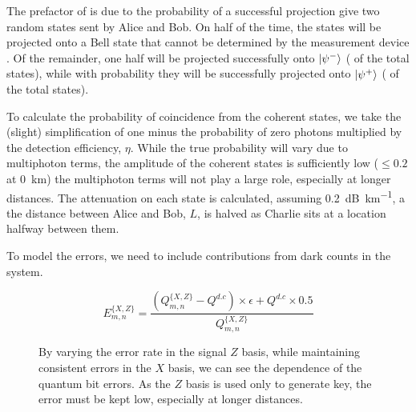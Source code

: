 The prefactor of  is due to the probability of a successful projection give two random states sent by Alice and Bob. On half of the time, the states will be projected onto a Bell state that cannot be determined by the measurement device \cite{}. Of the remainder, one half will be projected successfully onto $\ket{\psi^-}$ ( of the total states), while with probability  they will be successfully projected onto $\ket{\psi^+}$ ( of the total states). 

To calculate the probability of coincidence from the coherent states, we take the (slight) simplification of one minus the probability of zero photons multiplied by the detection efficiency, $\eta$. While the true probability will vary due to multiphoton terms, the amplitude of the coherent states is sufficiently low ($\le 0.2$ at \SI{0}{\km}) the multiphoton terms will not play a large role, especially at longer distances. The attenuation on each state is calculated, assuming \SI{0.2}{dB\per\km}, a the distance between Alice and Bob, $L$, is halved as Charlie sits at a location halfway between them.

To model the errors, we need to include contributions from dark counts in the system.

\begin{equation}
	E^{\{X,Z\}}_{m,n} = \frac{\left(Q^{\{X,Z\}}_{m,n} - Q^{d.c}\right) \times \epsilon + Q^{d.c} \times 0.5}{Q^{\{X,Z\}}_{m,n}}
\end{equation}


\begin{figure}[tbp]
	\caption[Error dependence of secret key rate]{By varying the error rate in the signal $Z$ basis, while maintaining consistent errors in the $X$ basis, we can see the dependence of the quantum bit errors. As the $Z$ basis is used only to generate key, the error must be kept low, especially at longer distances.}
	\label{fig:skr_error_dependence}
\end{figure}


